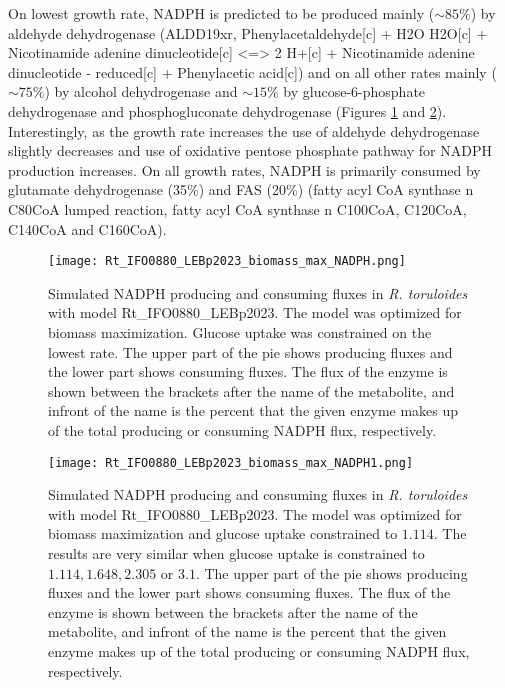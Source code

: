 On lowest growth rate, NADPH is predicted to be produced mainly ($\sim 85\%$) by aldehyde dehydrogenase (ALDD19xr, Phenylacetaldehyde[c] + H2O H2O[c] + Nicotinamide adenine dinucleotide[c] <=> 2 H+[c] + Nicotinamide adenine dinucleotide - reduced[c] + Phenylacetic acid[c]) and on all other rates mainly ($\sim 75\%$) by alcohol 
dehydrogenase and $\sim 15\%$ by glucose-6-phosphate dehydrogenase and phosphogluconate dehydrogenase (Figures \ref{fig:Rt_IFO0880_LEBp2023_biomass_max_NADPH0} and \ref{fig:Rt_IFO0880_LEBp2023_biomass_max_NADPH1}). 
Interestingly, as the growth rate increases the use of aldehyde dehydrogenase slightly decreases and use of oxidative pentose phosphate pathway for NADPH production increases. 
On all growth rates, NADPH is primarily consumed by glutamate dehydrogenase (35\%) and FAS (20\%) (fatty acyl CoA synthase n C80CoA lumped reaction, fatty acyl CoA synthase n C100CoA, C120CoA, C140CoA and C160CoA).
\begin{figure}[H]
    \centering
    \texttt{[image: Rt\_IFO0880\_LEBp2023\_biomass\_max\_NADPH.png]}
    \caption{Simulated NADPH producing and consuming fluxes in \textit{R. toruloides} with model Rt\_IFO0880\_LEBp2023. The model was optimized for biomass maximization. 
    Glucose uptake was constrained on the lowest rate. The upper part of the pie shows producing fluxes and the lower part shows consuming fluxes.
    The flux of the enzyme is shown between the brackets after the name of the metabolite, and infront of the name is the percent
    that the given enzyme makes up of the total producing or consuming NADPH flux, respectively.}
    \label{fig:Rt_IFO0880_LEBp2023_biomass_max_NADPH0}
\end{figure}
\begin{figure}[H]
    \centering
    \texttt{[image: Rt\_IFO0880\_LEBp2023\_biomass\_max\_NADPH1.png]}
    \caption{Simulated NADPH producing and consuming fluxes in \textit{R. toruloides} with model Rt\_IFO0880\_LEBp2023. The model was optimized for biomass maximization 
    and glucose uptake constrained to $1.114$. 
    The results are very similar when glucose uptake is constrained to $1.114, 1.648, 2.305$ or $3.1$. The upper part of the pie shows producing fluxes and the lower part shows consuming fluxes.
    The flux of the enzyme is shown between the brackets after the name of the metabolite, and infront of the name is the percent
    that the given enzyme makes up of the total producing or consuming NADPH flux, respectively.}
    \label{fig:Rt_IFO0880_LEBp2023_biomass_max_NADPH1}
\end{figure}

